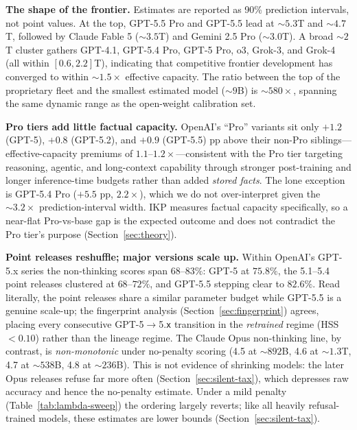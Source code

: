 \documentclass[11pt]{article}
\begin{document}
\textbf{The shape of the frontier.} Estimates are reported as 90\% prediction intervals, not point values. At the top, GPT-5.5 Pro and GPT-5.5 lead at ${\sim}5.3$T and ${\sim}4.7$T, followed by Claude Fable 5 (${\sim}3.5$T) and Gemini 2.5 Pro (${\sim}3.0$T). A broad ${\sim}2$T cluster gathers GPT-4.1, GPT-5.4 Pro, GPT-5 Pro, o3, Grok-3, and Grok-4 (all within $[0.6, 2.2]$T), indicating that competitive frontier development has converged to within ${\sim}1.5\times$ effective capacity. The ratio between the top of the proprietary fleet and the smallest estimated model (${\sim}9$B) is ${\sim}580\times$, spanning the same dynamic range as the open-weight calibration set.

\textbf{Pro tiers add little factual capacity.} OpenAI's ``Pro'' variants sit only $+1.2$ (GPT-5), $+0.8$ (GPT-5.2), and $+0.9$ (GPT-5.5) pp above their non-Pro siblings---effective-capacity premiums of $1.1$--$1.2\times$---consistent with the Pro tier targeting reasoning, agentic, and long-context capability through stronger post-training and longer inference-time budgets rather than added \emph{stored facts}. The lone exception is GPT-5.4 Pro ($+5.5$ pp, $2.2\times$), which we do not over-interpret given the ${\sim}3.2\times$ prediction-interval width. IKP measures factual capacity specifically, so a near-flat Pro-vs-base gap is the expected outcome and does not contradict the Pro tier's purpose (Section~\ref{sec:theory}).

\textbf{Point releases reshuffle; major versions scale up.} Within OpenAI's GPT-5.x series the non-thinking scores span $68$--$83\%$: GPT-5 at $75.8\%$, the 5.1--5.4 point releases clustered at $68$--$72\%$, and GPT-5.5 stepping clear to $82.6\%$. Read literally, the point releases share a similar parameter budget while GPT-5.5 is a genuine scale-up; the fingerprint analysis (Section~\ref{sec:fingerprint}) agrees, placing every consecutive GPT-5$\to$5.\texttt{x} transition in the \emph{retrained} regime (HSS $<0.10$) rather than the lineage regime. The Claude Opus non-thinking line, by contrast, is \emph{non-monotonic} under no-penalty scoring (4.5 at ${\sim}892$B, 4.6 at ${\sim}1.3$T, 4.7 at ${\sim}538$B, 4.8 at ${\sim}236$B). This is not evidence of shrinking models: the later Opus releases refuse far more often (Section~\ref{sec:silent-tax}), which depresses raw accuracy and hence the no-penalty estimate. Under a mild penalty (Table~\ref{tab:lambda-sweep}) the ordering largely reverts; like all heavily refusal-trained models, these estimates are lower bounds (Section~\ref{sec:silent-tax}).
\end{document}
